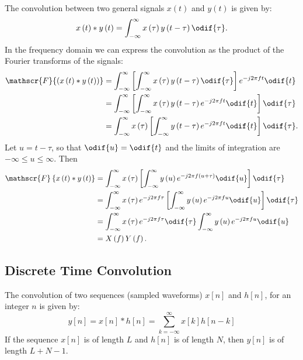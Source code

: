 \documentclass{article}
\begin{document}
The convolution between two general signals \(x\left( t \right)\) and
\(y\left( t \right)\) is given by:
\begin{equation*}
    x\left( t \right) \ast y\left( t \right) = \int_{-\infty}^\infty x\left( \tau \right) y\left( t - \tau \right) \odif{\tau}.
\end{equation*}
In the frequency domain we can express the convolution as the product of
the Fourier transforms of the signals:
\begin{align*}
    \mathscr{F}{\left( x\left( t \right) \ast y\left( t \right) \right)} & = \int_{-\infty}^\infty \left[ \int_{-\infty}^\infty x\left( \tau \right) y\left( t - \tau \right) \odif{\tau} \right] e^{-j 2 \pi f t} \odif{t}  \\
                                                                         & = \int_{-\infty}^\infty \left[ \int_{-\infty}^\infty x\left( \tau \right) y\left( t - \tau \right) e^{-j 2 \pi f t} \odif{t} \right] \odif{\tau}  \\
                                                                         & = \int_{-\infty}^\infty x\left( \tau \right) \left[ \int_{-\infty}^\infty y\left( t - \tau \right) e^{-j 2 \pi f t} \odif{t} \right] \odif{\tau}.
\end{align*}
Let \(u = t - \tau\), so that \(\odif{u} = \odif{t}\) and the limits of
integration are \(-\infty \leq u \leq \infty\). Then
\begin{align*}
    \mathscr{F}\left\{ x\left( t \right) \ast y\left( t \right) \right\} & = \int_{-\infty}^\infty x\left( \tau \right) \left[ \int_{-\infty}^\infty y\left( u \right) e^{-j 2 \pi f \left( u + \tau \right)} \odif{u} \right] \odif{\tau} \\
                                                                         & = \int_{-\infty}^\infty x\left( \tau \right) e^{-j 2 \pi f \tau} \left[ \int_{-\infty}^\infty y\left( u \right) e^{-j 2 \pi f u} \odif{u} \right] \odif{\tau}   \\
                                                                         & = \int_{-\infty}^\infty x\left( \tau \right) e^{-j 2 \pi f \tau} \odif{\tau} \int_{-\infty}^\infty y\left( u \right) e^{-j 2 \pi f u} \odif{u}                  \\
                                                                         & = X\left( f \right) Y\left( f \right).
\end{align*}
\subsection{Discrete Time Convolution}
The convolution of two sequences (sampled waveforms) \(x\left[ n
\right]\) and \(h\left[ n \right]\), for an integer \(n\) is given by:
\begin{equation*}
    y\left[ n \right] = x\left[ n \right] \ast h\left[ n \right] = \sum_{k = -\infty}^\infty x\left[ k \right] h\left[ n - k \right]
\end{equation*}
If the sequence \(x\left[ n \right]\) is of length \(L\) and \(h\left[ n \right]\) is of length \(N\),
then \(y\left[ n \right]\) is of length \(L + N - 1\).
\end{document}

